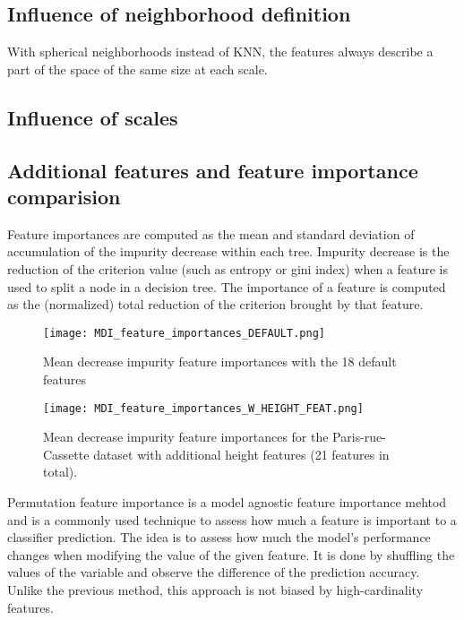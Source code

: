 \documentclass{article}
\begin{document}
\subsection{Influence of neighborhood definition}
With spherical neighborhoods instead of KNN, the features always describe a part of the space of the same size at each scale.

\subsection{Influence of scales}

\subsection{Additional features and feature importance comparision}

Feature importances are computed as the mean and standard deviation of accumulation of the impurity decrease within each tree.  Impurity decrease is the reduction of the criterion value (such as entropy or gini index) when a feature is used to split a node in a decision tree. The importance of a feature is computed as the (normalized) total reduction of the criterion brought by that feature.

\begin{figure}
    \hspace*{-2cm}  
        \texttt{[image: MDI\_feature\_importances\_DEFAULT.png]}
        \caption{Mean decrease impurity feature importances with the 18 default features}
        \label{fig:MDI_default}
\end{figure}
\begin{figure}
    \hspace*{-2cm}
        \texttt{[image: MDI\_feature\_importances\_W\_HEIGHT\_FEAT.png]}
    \caption{Mean decrease impurity feature importances for the Paris-rue-Cassette dataset with additional height features (21 features in total).}
    \label{fig:MDI_height}
\end{figure}


Permutation feature importance is a model agnostic feature importance mehtod and is a commonly used technique to assess how much a feature is important to a classifier prediction. The idea is to assess how much the model's performance changes when modifying the value of the given feature. It is done by shuffling the values of the variable and observe the difference of the prediction accuracy.
Unlike the previous method, this approach is not biased by high-cardinality features.
\end{document}
